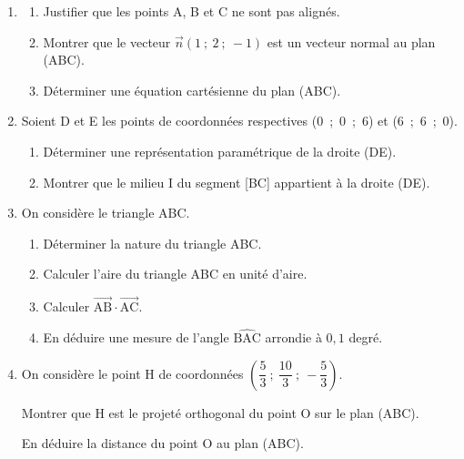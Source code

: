 \documentclass[10pt]{article}
\providecommand{\vect}[1]{\overrightarrow{#1}}
\begin{document}
\begin{enumerate}
\item 
	\begin{enumerate}
		\item Justifier que les points A, B et C ne sont pas alignés.
		\item Montrer que le vecteur $\vect{n}(1~;~2~;~-1)$ est
un vecteur normal au plan (ABC).
		\item Déterminer une équation cartésienne du plan (ABC).
	\end{enumerate}
\item Soient D et E les points de coordonnées respectives (0~;~0~;~6) et (6~;~6~;~0).
	\begin{enumerate}
		\item Déterminer une représentation paramétrique de la droite (DE).
		\item Montrer que le milieu I du segment [BC] appartient à la droite (DE).
	\end{enumerate}	
\item On considère le triangle ABC.
	\begin{enumerate}
		\item Déterminer la nature du triangle ABC.
		\item Calculer l'aire du triangle ABC en unité d'aire.
		\item Calculer $\vect{\text{AB}}  \cdot \vect{\text{AC}}$.
		\item En déduire une mesure de l'angle $\widehat{\text{BAC}}$ arrondie à $0,1$ degré.
	\end{enumerate}	
\item On considère le point H de coordonnées $\left(\dfrac53~;~\dfrac{10}{3}~;~- \dfrac53\right)$.

Montrer que H est le projeté orthogonal du point O sur le plan (ABC). 

En déduire la distance du point O au plan (ABC).
\end{enumerate}
\end{document}

